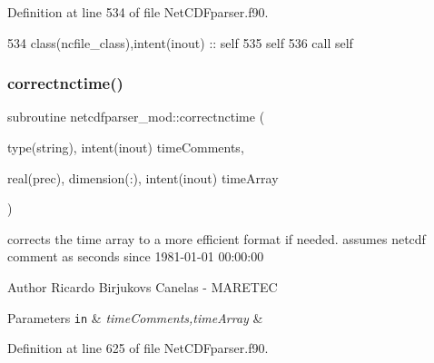Definition at line 534 of file Net\+C\+D\+Fparser.\+f90.


\begin{DoxyCode}
534     \textcolor{keywordtype}{class}(ncfile\_class),\textcolor{keywordtype}{intent(inout)} :: self
535     self%
536     \textcolor{keyword}{call }self%
\end{DoxyCode}
\mbox{\label{namespacenetcdfparser__mod_af93319fde6cf6baedb7fe27bf3396e7b}} 
\subsubsection{\texorpdfstring{correctnctime()}{correctnctime()}}
{\footnotesize\ttfamily subroutine netcdfparser\+\_\+mod\+::correctnctime (\begin{DoxyParamCaption}\item[{type(string), intent(inout)}]{time\+Comments,  }\item[{real(prec), dimension(\+:), intent(inout)}]{time\+Array }\end{DoxyParamCaption})\hspace{0.3cm}{\ttfamily [private]}}



corrects the time array to a more efficient format if needed. assumes netcdf comment as \textquotesingle{}seconds since 1981-\/01-\/01 00\+:00\+:00\textquotesingle{} 

\begin{DoxyAuthor}{Author}
Ricardo Birjukovs Canelas -\/ M\+A\+R\+E\+T\+EC 
\end{DoxyAuthor}

\begin{DoxyParams}[1]{Parameters}
\mbox{\tt in}  & {\em time\+Comments,time\+Array} & \\
\hline
\end{DoxyParams}


Definition at line 625 of file Net\+C\+D\+Fparser.\+f90.


